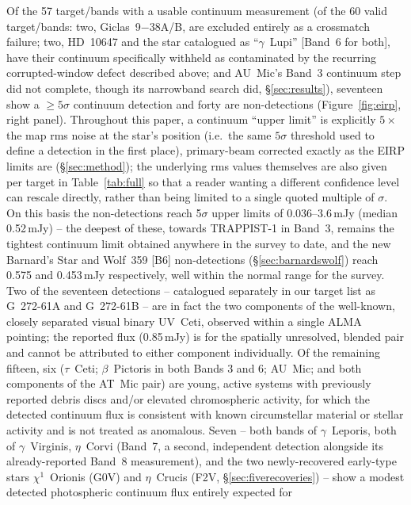 \documentclass{openjournal}
\begin{document}
Of the 57 target/bands with a usable continuum measurement (of the 60
valid target/bands: two, Giclas~9$-$38A/B, are excluded entirely as a
crossmatch failure; two, HD~10647 and the star catalogued as
``$\gamma$~Lupi'' [Band~6 for both], have their continuum specifically
withheld as contaminated by the recurring corrupted-window defect
described above; and AU~Mic's Band~3 continuum step did not complete,
though its narrowband search did, \S\ref{sec:results}), seventeen show a
$\geq5\sigma$ continuum detection and forty are non-detections
(Figure~\ref{fig:eirp}, right panel). Throughout this paper, a continuum
``upper limit'' is explicitly $5\times$ the map rms noise at the star's
position (i.e.\ the same $5\sigma$ threshold used to define a detection
in the first place), primary-beam corrected exactly as the EIRP limits
are (\S\ref{sec:method}); the underlying rms values themselves are also
given per target in Table~\ref{tab:full} so that a reader wanting a
different confidence level can rescale directly, rather than being
limited to a single quoted multiple of $\sigma$. On this basis the
non-detections reach 5$\sigma$ upper limits of 0.036--3.6\,mJy (median
0.52\,mJy) -- the deepest of these, towards TRAPPIST-1 in Band~3, remains
the tightest continuum limit obtained anywhere in the survey to date,
and the new Barnard's Star and Wolf~359 [B6] non-detections
(\S\ref{sec:barnardswolf}) reach 0.575 and 0.453\,mJy respectively, well
within the normal range for the survey. Two of the seventeen detections --
catalogued separately in our target list
as G~272-61A and G~272-61B -- are in fact the two components of the
well-known, closely separated visual binary UV~Ceti, observed within a
single ALMA pointing; the reported flux (0.85\,mJy) is for the spatially
unresolved, blended pair and cannot be attributed to either component
individually. Of the remaining fifteen, six ($\tau$~Ceti; $\beta$~Pictoris in
both Bands 3 and 6; AU~Mic; and both components of the AT~Mic pair) are
young, active systems with previously reported debris discs and/or
elevated chromospheric activity, for which the detected continuum flux
is consistent with known circumstellar material or stellar activity and
is not treated as anomalous. Seven -- both bands of
$\gamma$~Leporis, both of $\gamma$~Virginis, $\eta$~Corvi (Band~7, a
second, independent detection alongside its already-reported Band~8
measurement), and the two newly-recovered early-type stars
$\chi^{1}$~Orionis (G0V) and $\eta$~Crucis (F2V,
\S\ref{sec:fiverecoveries}) -- show a modest detected photospheric
continuum flux entirely expected for
\end{document}
